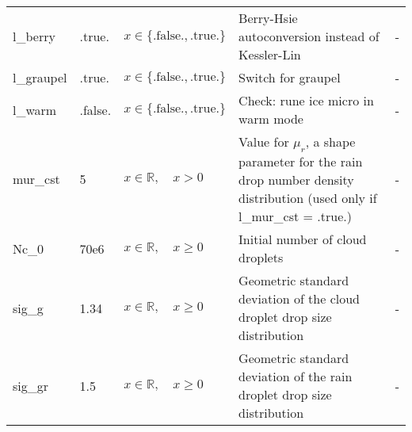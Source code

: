 \documentclass[twoside,11pt,fleqn,a4paper,english,openright]{report}
\begin{document}
\begin{center}
\begin{supertabular}{|l|p{1.6cm}|p{4cm}|p{6cm}|l|}
    l\_berry	& .true.		& $x\in\{\text{.false.},\text{.true.}\}$	& Berry-Hsie autoconversion instead of Kessler-Lin	& -\\
  l\_graupel	& .true.		& $x\in\{\text{.false.},\text{.true.}\}$	& Switch for graupel	& -\\
  l\_warm	& .false.		& $x\in\{\text{.false.},\text{.true.}\}$	& Check: rune ice micro in warm mode	& -\\
  mur\_cst	& 5			& $x \in \mathbb{R}, \quad x>0$	& Value for $\mu_r$, a shape parameter for the rain drop number density distribution (used only if l\_mur\_cst = .true.)	& -\\
  Nc\_0		& 70e6			& $x \in \mathbb{R}, \quad x \ge 0$	& Initial number of cloud droplets			& -\\
  sig\_g	& 1.34			& $x \in \mathbb{R}, \quad x \ge 0$	& Geometric standard deviation of the cloud droplet drop size distribution			& -\\
  sig\_gr	& 1.5		& $x \in \mathbb{R}, \quad x \ge 0$	& Geometric standard deviation of the rain droplet drop size distribution			& -\\
\end{supertabular}
\end{center}

\end{document}
